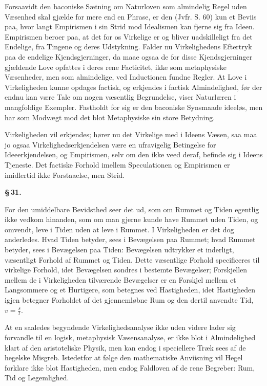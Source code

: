 \documentclass[12pt]{book}
\newcommand{\opage}[1]{\marginnote{\footnotesize\textit{[#1]}}}
\begin{document}
Forsaavidt den baconiske Sætning om Naturloven som almindelig Regel uden Væsenhed skal gjælde for
mere end en Phrase, er den (Jvfr. S. 60) kun et Beviis paa, hvor langt Empirismen i sin Strid mod
Idealismen kan fjerne sig fra Ideen. Empirismen beroer paa, at det for os Virkelige er og bliver
uadskilleligt fra det Endelige, fra Tingene og deres Udstykning. Falder nu Virkelighedens
Eftertryk paa de endelige Kjendsgjerninger, da maae ogsaa de for disse Kjendsgjerninger gjældende
Love opfattes i deres rene Facticitet,
\opage{161} ikke som metaphysiske Væsenheder, men som almindelige, ved Inductionen fundne Regler. At Love i
Virkeligheden kunne opdages factisk, og erkjendes i factisk Almindelighed, før der endnu kan være
Tale om nogen væsentlig Begrundelse, viser Naturlæren i mangfoldige Exempler. Fastholdt for sig er
den baconiske Synsmaade ideeløs, men har som Modvægt mod det blot Metaphysiske sin store Betydning.

Virkeligheden vil erkjendes; hører nu det Virkelige med i Ideens Væsen, saa maa jo ogsaa
Virkelighedserkjendelsen være en ufravigelig Betingelse for Ideeerkjendelsen, og Empirismen, selv
om den ikke veed deraf, befinde sig i Ideens Tjeneste. Det factiske Forhold imellem Speculationen
og Empirismen er imidlertid ikke Forstaaelse, men Strid.

\begin{center}{\bfseries \S\,31.}\end{center}

For den umiddelbare Bevidsthed seer det ud, som om Rummet og Tiden egentlig ikke vedkom hinanden,
som om man gjerne kunde have Rummet uden Tiden, og omvendt, leve i Tiden uden at leve i Rummet. I
Virkeligheden er det dog anderledes. Hvad Tiden betyder, sees i Bevægelsen paa Rummet; hvad Rummet
betyder, sees i Bevægelsen paa Tiden: Bevægelsen udtrykker et inderligt, væsentligt Forhold af
Rummet og Tiden. Dette væsentlige Forhold specificeres til virkelige Forhold, idet Bevægelsen
sondres i bestemte Bevægelser; Forskjellen mellem de i Virkeligheden tilværende Bevægelser er en
Forskjel mellem et Langsommere og et Hurtigere, som betegnes ved Hastigheden, idet Hastigheden
igjen betegner Forholdet af det gjennemløbne Rum og den dertil anvendte Tid, $v=\frac{s}{t}$.

At en saaledes begyndende Virkelighedsanalyse ikke uden videre lader sig forvandle til en logisk,
metaphysisk Væsensanalyse, er ikke blot i Almindelighed klart af den aristoteliske Physik, men kan
endog i speciellere Træk sees af de hegelske Misgreb. Istedetfor at følge den mathematiske
Anviisning
\opage{162} vil Hegel forklare ikke blot Hastigheden, men endog Faldloven af de rene
Begreber: Rum, Tid og Legemlighed.
\end{document}
